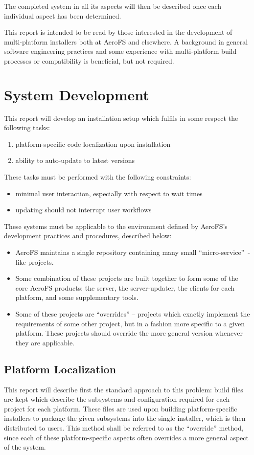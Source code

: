 \documentclass[12pt]{article}
\begin{document}
The completed system in all its aspects will then be described once each individual aspect has been determined.

This report is intended to be read by those interested in the development of multi-platform installers both at AeroFS and elsewhere. A background in general software engineering practices and some experience with multi-platform build processes or compatibility is beneficial, but not required.
\newpage


\section{System Development}
This report will develop an installation setup which fulfils in some respect the following tasks:
\begin{enumerate}
\item platform-specific code localization upon installation
\item ability to auto-update to latest versions
\end{enumerate}

These tasks must be performed with the following constraints:
\begin{itemize}
\item minimal user interaction, especially with respect to wait times
\item updating should not interrupt user workflows
\end{itemize}

These systems must be applicable to the environment defined by AeroFS's development practices and procedures, described below:
\begin{itemize}
\item AeroFS maintains a single repository containing many small ``micro-service''~\cite{microservices}-like projects.
\item Some combination of these projects are built together to form some of the core AeroFS products: the server, the server-updater, the clients for each platform, and some supplementary tools.
\item Some of these projects are ``overrides'' -- projects which exactly implement the requirements of some other project, but in a fashion more specific to a given platform. These projects should override the more general version whenever they are applicable.
\end{itemize}

\subsection{Platform Localization}
This report will describe first the standard approach to this problem: build files are kept which describe the subsystems and configuration required for each project for each platform. These files are used upon building platform-specific installers to package the given subsystems into the single installer, which is then distributed to users. This method shall be referred to as the ``override'' method, since each of these platform-specific aspects often overrides a more general aspect of the system.
\end{document}
